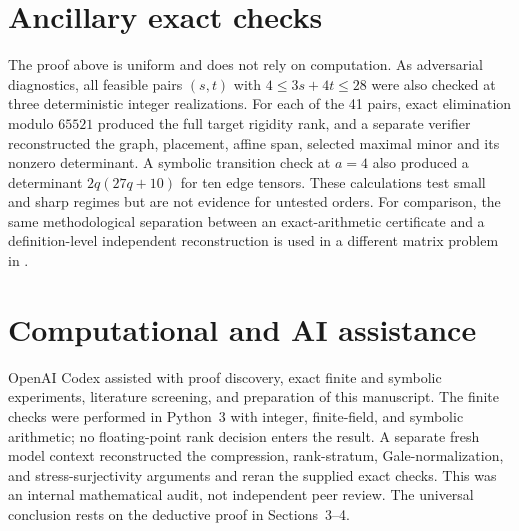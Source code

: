 \documentclass[11pt]{article}
\begin{document}
\section{Ancillary exact checks}

The proof above is uniform and does not rely on computation.  As adversarial
diagnostics, all feasible pairs $(s,t)$ with $4\leq3s+4t\leq28$ were also
checked at three deterministic integer realizations.  For each of the 41
pairs, exact elimination modulo $65521$ produced the full target rigidity
rank, and a separate verifier reconstructed the graph, placement, affine
span, selected maximal minor and its nonzero determinant.  A symbolic
transition check at $a=4$ also produced a determinant
$2q(27q+10)$ for ten edge tensors.  These calculations test small and sharp
regimes but are not evidence for untested orders.  For comparison, the same
methodological separation between an exact-arithmetic certificate and a
definition-level independent reconstruction is used in a different matrix
problem in \cite{ZengEtAl2026ExactPositivity}.

\section*{Computational and AI assistance}

OpenAI Codex assisted with proof discovery, exact finite and symbolic
experiments, literature screening, and preparation of this manuscript.  The
finite checks were performed in Python~3 with integer, finite-field, and
symbolic arithmetic; no floating-point rank decision enters the result.  A
separate fresh model context reconstructed the compression, rank-stratum,
Gale-normalization, and stress-surjectivity arguments and reran the supplied
exact checks.  This was an internal mathematical audit, not independent peer
review.  The universal conclusion rests on the deductive proof in
Sections~3--4.



\end{document}
